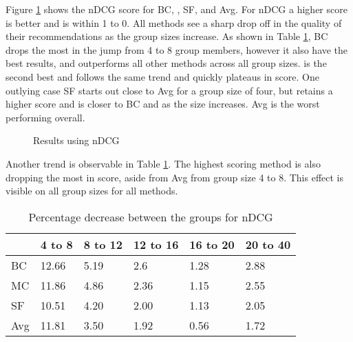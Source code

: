 Figure \ref{fig:ndcg} shows the nDCG score for BC, \MC, SF, and Avg. For nDCG a higher score is better and is within 1 to 0.
All methods see a sharp drop off in the quality of their recommendations as the group sizes increase.
As shown in Table \ref{tbl:ndcg}, BC drops the most in the jump from 4 to 8 group members, however it also have the best results, and outperforms all other methods across all group sizes.
\MC is the second best and follows the same trend and quickly plateaus in score.
One outlying case SF starts out close to Avg for a group size of four, but retains a higher score and is closer to BC and \MC as the size increases.
Avg is the worst performing overall.

\begin{figure}[H]
	\caption{Results using nDCG}\label{fig:ndcg}
\end{figure}

Another trend is observable in Table \ref{tbl:ndcg}. The highest scoring method is also dropping the most in score, aside from Avg from group size 4 to 8. This effect is visible on all group sizes for all methods.

\begin{table}[H]
	\centering
	\begin{tabular}{|l|lllll|}\hline
		& 4 to 8 & 8 to 12 & 12 to 16 & 16 to 20 & 20 to 40 \\\hline
		BC 	& 12.66	& 5.19	& 2.6	& 1.28	& 2.88 \\
		MC  & 11.86	& 4.86	& 2.36	& 1.15	& 2.55 \\
		SF  & 10.51	& 4.20	& 2.00	& 1.13	& 2.05 \\
		Avg	& 11.81	& 3.50 	& 1.92	& 0.56	& 1.72 \\ \hline
	\end{tabular}
	\caption{Percentage decrease between the groups for nDCG}
	\label{tbl:ndcg}
\end{table}

